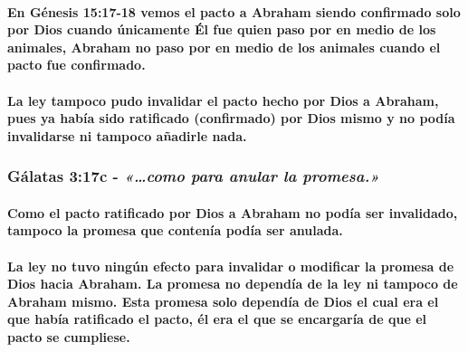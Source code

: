 \documentclass[11a pt,twoside]{article}
\newcommand{\scripture}[1]{%
  {\fontsize{12pt}{16pt}\selectfont\ScriptureFont\itshape #1}%
}
\let\oldsubsubsection\subsubsection
\renewcommand{\subsubsection}{\needspace{4\baselineskip}\oldsubsubsection}
\let\oldparagraph\paragraph
\renewcommand{\paragraph}{\needspace{3\baselineskip}\oldparagraph}
\begin{document}
\paragraph{En Génesis 15:17-18 vemos el pacto a Abraham siendo
confirmado solo por Dios cuando únicamente Él fue quien paso por en
medio de los animales, Abraham no paso por en medio de los animales
cuando el pacto fue
confirmado.}\label{en-guxe9nesis-1517-18-vemos-el-pacto-a-abraham-siendo-confirmado-solo-por-dios-cuando-uxfanicamente-uxe9l-fue-quien-paso-por-en-medio-de-los-animales-abraham-no-paso-por-en-medio-de-los-animales-cuando-el-pacto-fue-confirmado.}

\paragraph{La ley tampoco pudo invalidar el pacto hecho por Dios a
Abraham, pues ya había sido ratificado (confirmado) por Dios mismo y no
podía invalidarse ni tampoco añadirle
nada.}\label{la-ley-tampoco-pudo-invalidar-el-pacto-hecho-por-dios-a-abraham-pues-ya-habuxeda-sido-ratificado-confirmado-por-dios-mismo-y-no-poduxeda-invalidarse-ni-tampoco-auxf1adirle-nada.}

\subsubsection{\texorpdfstring{Gálatas 3:17c -
\scripture{«…como para anular la promesa.»}}{Gálatas 3:17c - }}\label{guxe1latas-317c---como-para-anular-la-promesa.}

\paragraph{Como el pacto ratificado por Dios a Abraham no podía ser
invalidado, tampoco la promesa que contenía podía ser
anulada.}\label{como-el-pacto-ratificado-por-dios-a-abraham-no-poduxeda-ser-invalidado-tampoco-la-promesa-que-contenuxeda-poduxeda-ser-anulada.}

\paragraph{La ley no tuvo ningún efecto para invalidar o modificar la
promesa de Dios hacia Abraham. La promesa no dependía de la ley ni
tampoco de Abraham mismo. Esta promesa solo dependía de Dios el cual era
el que había ratificado el pacto, él era el que se encargaría de que el
pacto se
cumpliese.}\label{la-ley-no-tuvo-ninguxfan-efecto-para-invalidar-o-modificar-la-promesa-de-dios-hacia-abraham.-la-promesa-no-dependuxeda-de-la-ley-ni-tampoco-de-abraham-mismo.-esta-promesa-solo-dependuxeda-de-dios-el-cual-era-el-que-habuxeda-ratificado-el-pacto-uxe9l-era-el-que-se-encargaruxeda-de-que-el-pacto-se-cumpliese.}
\end{document}
